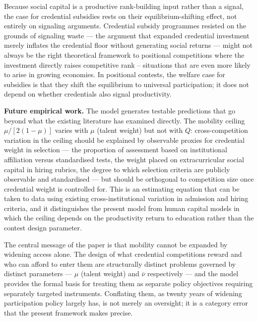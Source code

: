 \documentclass[
    oneside,
    fontsize=10pt,leqno]{article}
\begin{document}
Because social capital is a productive rank-building input rather
than a signal, the case for credential subsidies rests on their
equilibrium-shifting effect, not entirely on signaling arguments.
Credential subsidy programmes resisted on the grounds of
signaling waste --- the argument that expanded credential
investment merely inflates the credential floor without
generating social returns --- might not always be the right theoretical
framework to positional competitions where the investment
directly raises competitive rank -- situations that are even more likely to arise in growing economies. In positional contests, the
welfare case for subsidies is that they shift the equilibrium
to universal participation; it does not depend on whether
credentials also signal productivity.

\medskip
\noindent\textbf{Future empirical work.} The model generates
testable predictions that go beyond what the existing literature
has examined directly. The mobility ceiling $\mu/[2(1-\mu)]$
varies with $\mu$ (talent weight) but not with $Q$: cross-competition variation
in the ceiling should be explained by observable proxies for
credential weight in selection --- the proportion of assessment
based on institutional affiliation versus standardised tests,
the weight placed on extracurricular social capital in hiring
rubrics, the degree to which selection criteria are publicly
observable and standardised --- but should be orthogonal to
competition size once credential weight is controlled for. This
is an estimating equation that can be taken to data using
existing cross-institutional variation in admission and hiring
criteria, and it distinguishes the present model from human
capital models in which the ceiling depends on the productivity
return to education rather than the contest design parameter.

The central message of the paper is that mobility cannot be
expanded by widening access alone. The design of what credential
competitions reward and who can afford to enter them are
structurally distinct problems governed by distinct parameters
--- $\mu$ (talent weight) and $\overline{\nu}$ respectively --- and the model
provides the formal basis for treating them as separate policy
objectives requiring separately targeted instruments. Conflating
them, as twenty years of widening participation policy largely
has, is not merely an oversight; it is a category error that the
present framework makes precise.


\end{document}
